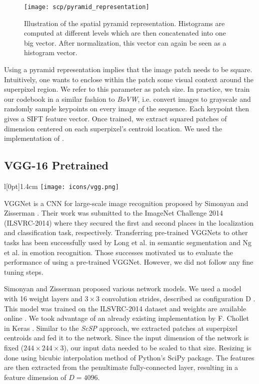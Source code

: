 \begin{figure}[htbp]
  \centering
  \texttt{[image: scp/pyramid\_representation]}
  \caption[Spatial pyramid representation]{Illustration of the spatial pyramid representation. Histograms are computed at different levels which are then concatenated into one big vector. After normalization, this vector can again be seen as a histogram vector.}
  \label{fig:pyramid_repr}
\end{figure}

Using a pyramid representation implies that the image patch needs to be square. Intuitively, one wants to enclose within the patch some visual context around the superpixel region. We refer to this parameter as patch size.
In practice, we train our codebook in a similar fashion to \textit{BoVW}, i.e. convert images to grayscale and randomly sample keypoints on every image of the sequence. Each keypoint then gives a SIFT feature vector. Once trained, we extract squared patches of dimension centered on each superpixel's centroid location. We used the implementation of \cite{imdescrip}.

\subsection{VGG-16 Pretrained} \label{vgg}
\begingroup
\setlength\intextsep{0pt}
\begin{wrapfigure}[4]{l}[0pt]{1.4cm}
\texttt{[image: icons/vgg.png]}
\end{wrapfigure}

VGGNet is a CNN for large-scale image recognition proposed by Simonyan and Zisserman \cite{simonyan15}.
Their work was submitted to the ImageNet \cite{ILSVRC15} Challenge 2014 (ILSVRC-2014) where they secured the first and second places in the localization and classification task, respectively.
Transferring pre-trained VGGNets to other tasks has been successfully used by Long et al.
\cite{long15} in semantic segmentation and Ng et al. \cite{ng15} in emotion recognition. Those successes motivated us to evaluate the performance of using a pre-trained VGGNet. However, we did not follow any fine tuning steps.

\endgroup

Simonyan and Zisserman \cite{simonyan15} proposed various network models.
We used a model with 16 weight layers and $3 \times 3$ convolution strides, described as configuration D \cite[Tab. 1]{simonyan15}.
This model was trained on the ILSVRC-2014 dataset and weights are available online \cite{simonyan14a}.
We took advantage of an already existing implementation by F. Chollet in Keras \cite{Keras}.
Similar to the \textit{ScSP} approach, we extracted patches at superpixel centroids and fed it to the network.
Since the input dimension of the network is fixed ($244 \times 244 \times 3$), our input data needed to be scaled to that size.
Resizing is done using bicubic interpolation method of Python's SciPy \cite{scipy} package.
The features are then extracted from the penultimate fully-connected layer, resulting in a feature dimension of $D=4096$.

